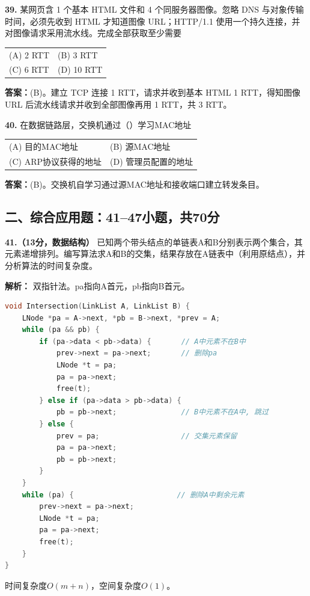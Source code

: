 \noindent\textbf{39.} 某网页含 1 个基本 HTML 文件和 4 个同服务器图像。忽略 DNS 与对象传输时间，必须先收到 HTML 才知道图像 URL；HTTP/1.1 使用一个持久连接，并对图像请求采用流水线。完成全部获取至少需要
\begin{center}
\begin{tabular}{ll}
(A) 2 RTT & (B) 3 RTT \\[6pt]
(C) 6 RTT & (D) 10 RTT
\end{tabular}
\end{center}

\ifshowsolutions\par\noindent\textbf{答案：}(B)。建立 TCP 连接 1 RTT，请求并收到基本 HTML 1 RTT，得知图像 URL 后流水线请求并收到全部图像再用 1 RTT，共 3 RTT。\else \answerarea \fi

\vspace{6pt}

\noindent\textbf{40.} 在数据链路层，交换机通过（\quad）学习MAC地址
\begin{center}
\begin{tabular}{ll}
(A) 目的MAC地址 & (B) 源MAC地址 \\[6pt]
(C) ARP协议获得的地址 & (D) 管理员配置的地址
\end{tabular}
\end{center}

\ifshowsolutions\par\noindent\textbf{答案：}(B)。交换机自学习通过源MAC地址和接收端口建立转发条目。\else \answerarea \fi

\newpage

\subsection*{二、综合应用题：41--47小题，共70分}

\noindent\textbf{41.（13分，数据结构）} 已知两个带头结点的单链表A和B分别表示两个集合，其元素递增排列。编写算法求A和B的交集，结果存放在A链表中（利用原结点），并分析算法的时间复杂度。

\ifshowsolutions\par\noindent\textbf{解析：} 双指针法。pa指向A首元，pb指向B首元。
\begin{lstlisting}[language=C]
void Intersection(LinkList A, LinkList B) {
    LNode *pa = A->next, *pb = B->next, *prev = A;
    while (pa && pb) {
        if (pa->data < pb->data) {       // A中元素不在B中
            prev->next = pa->next;       // 删除pa
            LNode *t = pa;
            pa = pa->next;
            free(t);
        } else if (pa->data > pb->data) {
            pb = pb->next;               // B中元素不在A中, 跳过
        } else {
            prev = pa;                   // 交集元素保留
            pa = pa->next;
            pb = pb->next;
        }
    }
    while (pa) {                        // 删除A中剩余元素
        prev->next = pa->next;
        LNode *t = pa;
        pa = pa->next;
        free(t);
    }
}
\end{lstlisting}
时间复杂度$O(m+n)$，空间复杂度$O(1)$。\else \answerarea[8] \fi

